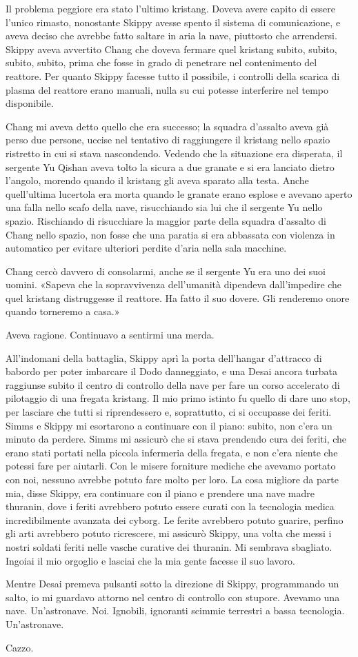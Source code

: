 Il problema peggiore era stato l'ultimo kristang. Doveva avere capito di
essere l'unico rimasto, nonostante Skippy avesse spento il sistema di
comunicazione, e aveva deciso che avrebbe fatto saltare in aria la nave,
piuttosto che arrendersi. Skippy aveva avvertito Chang che doveva
fermare quel kristang subito, subito, subito, subito, prima che fosse in
grado di penetrare nel contenimento del reattore. Per quanto Skippy
facesse tutto il possibile, i controlli della scarica di plasma del
reattore erano manuali, nulla su cui potesse interferire nel tempo
disponibile.

Chang mi aveva detto quello che era successo; la squadra d'assalto aveva
già perso due persone, uccise nel tentativo di raggiungere il kristang
nello spazio ristretto in cui si stava nascondendo. Vedendo che la
situazione era disperata, il sergente Yu Qishan aveva tolto la sicura a
due granate e si era lanciato dietro l'angolo, morendo quando il
kristang gli aveva sparato alla testa. Anche quell'ultima lucertola era
morta quando le granate erano esplose e avevano aperto una falla nello
scafo della nave, risucchiando sia lui che il sergente Yu nello spazio.
Rischiando di risucchiare la maggior parte della squadra d'assalto di
Chang nello spazio, non fosse che una paratia si era abbassata con
violenza in automatico per evitare ulteriori perdite d'aria nella sala
macchine.

Chang cercò davvero di consolarmi, anche se il sergente Yu era uno dei
suoi uomini. «Sapeva che la sopravvivenza dell'umanità dipendeva
dall'impedire che quel kristang distruggesse il reattore. Ha fatto il
suo dovere. Gli renderemo onore quando torneremo a casa.»

Aveva ragione. Continuavo a sentirmi una merda.

\hfill\break

All'indomani della battaglia, Skippy aprì la porta dell'hangar
d'attracco di babordo per poter imbarcare il Dodo danneggiato, e una
Desai ancora turbata raggiunse subito il centro di controllo della nave
per fare un corso accelerato di pilotaggio di una fregata kristang. Il
mio primo istinto fu quello di dare uno stop, per lasciare che tutti si
riprendessero e, soprattutto, ci si occupasse dei feriti. Simms e Skippy
mi esortarono a continuare con il piano: subito, non c'era un minuto da
perdere. Simms mi assicurò che si stava prendendo cura dei feriti, che
erano stati portati nella piccola infermeria della fregata, e non c'era
niente che potessi fare per aiutarli. Con le misere forniture mediche
che avevamo portato con noi, nessuno avrebbe potuto fare molto per loro.
La cosa migliore da parte mia, disse Skippy, era continuare con il piano
e prendere una nave madre thuranin, dove i feriti avrebbero potuto
essere curati con la tecnologia medica incredibilmente avanzata dei
cyborg. Le ferite avrebbero potuto guarire, perfino gli arti avrebbero
potuto ricrescere, mi assicurò Skippy, una volta che messi i nostri
soldati feriti nelle vasche curative dei thuranin. Mi sembrava
sbagliato. Ingoiai il mio orgoglio e lasciai che la mia gente facesse il
suo lavoro.

Mentre Desai premeva pulsanti sotto la direzione di Skippy, programmando
un salto, io mi guardavo attorno nel centro di controllo con stupore.
Avevamo una nave. Un'astronave. Noi. Ignobili, ignoranti scimmie
terrestri a bassa tecnologia. Un'astronave.

Cazzo.